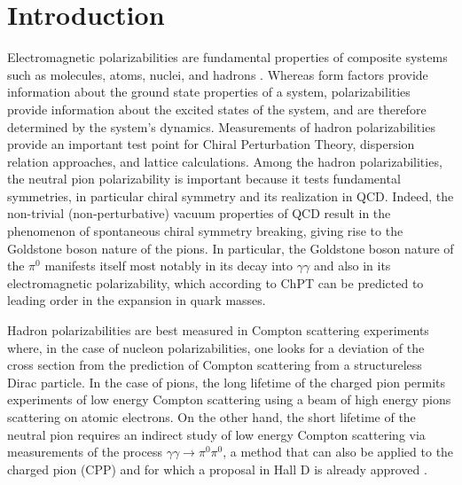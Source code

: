 \section{Introduction}

Electromagnetic polarizabilities are fundamental properties of
composite systems such as molecules, atoms, nuclei, and hadrons
\cite{Holstein:1990qy}. Whereas form factors provide information
about the ground state properties of a system, polarizabilities
provide information about the excited states of the system, and are
  therefore determined by the system's dynamics.
Measurements of hadron polarizabilities provide an important test
point for Chiral Perturbation Theory, dispersion relation approaches,
and lattice calculations. Among the hadron polarizabilities, the
neutral pion polarizability is important because it
tests fundamental symmetries, in particular chiral symmetry and its
realization in QCD.  Indeed, the non-trivial (non-perturbative) vacuum
properties of QCD result in the phenomenon of spontaneous chiral
symmetry breaking, giving rise to the Goldstone boson nature of the
pions.  In particular, the Goldstone boson nature of the $\pi^0$
manifests itself most notably in its decay into $\gamma\gamma$ and
also in its electromagnetic polarizability, which according to ChPT
can be predicted to leading order in the expansion in quark
masses.


Hadron polarizabilities are best measured in Compton scattering
experiments where, in the case of nucleon polarizabilities, one looks
for a deviation of the cross section from the prediction of Compton
scattering from a structureless Dirac particle.
In the case of pions, the long lifetime of the charged pion permits
experiments of low energy Compton scattering using a beam of high
energy pions scattering on atomic electrons. On the other hand, the
short lifetime of the neutral pion requires an indirect study of low
energy Compton scattering via measurements of the process $\gamma
\gamma \rightarrow \pi^0 \pi^0$, a method that can also be applied to
the charged pion (CPP) and for which a proposal in Hall D is already
approved \cite{CPPexp}.

